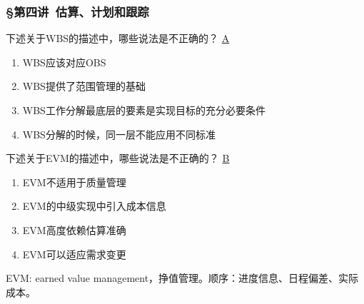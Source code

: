 \subsubsection*{\S 第四讲\ 估算、计划和跟踪}
\setcounter{problemname}{0}

\begin{problem}
	下述关于WBS的描述中，哪些说法是不正确的？ 
	\uline{A}    
        \begin{enumerate}[label=\Alph*.]
            \item WBS应该对应OBS
            \item WBS提供了范围管理的基础
            \item WBS工作分解最底层的要素是实现目标的充分必要条件
            \item WBS分解的时候，同一层不能应用不同标准
        \end{enumerate}
\end{problem}




\begin{problem}
	下述关于EVM的描述中，哪些说法是不正确的？
	\uline{B}    
    \vspace{-0.8em}
    \begin{multicols}{2}
        \begin{enumerate}[label=\Alph*.]
            \item EVM不适用于质量管理
            \item EVM的中级实现中引入成本信息
            \item EVM高度依赖估算准确
            \item EVM可以适应需求变更
        \end{enumerate}
    \end{multicols}
    \vspace{-1em}
\end{problem}

\begin{solution}
EVM: earned value management，挣值管理。顺序：进度信息、日程偏差、实际成本。
\end{solution}

